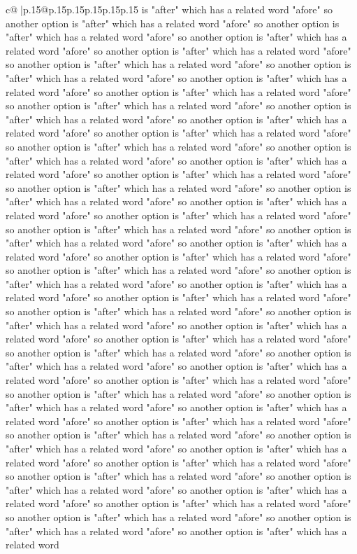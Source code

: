 \documentclass{article}
\begin{document}
{\begin{supertabular}{c@{$\;$}|p{.15\linewidth}@{}p{.15\linewidth}p{.15\linewidth}p{.15\linewidth}p{.15\linewidth}p{.15\linewidth}}
{{{is "after" which has a related word "afore" so another option is "after" which has a related word "afore" so another option is "after" which has a related word "afore" so another option is "after" which has a related word "afore" so another option is "after" which has a related word "afore" so another option is "after" which has a related word "afore" so another option is "after" which has a related word "afore" so another option is "after" which has a related word "afore" so another option is "after" which has a related word "afore" so another option is "after" which has a related word "afore" so another option is "after" which has a related word "afore" so another option is "after" which has a related word "afore" so another option is "after" which has a related word "afore" so another option is "after" which has a related word "afore" so another option is "after" which has a related word "afore" so another option is "after" which has a related word "afore" so another option is "after" which has a related word "afore" so another option is "after" which has a related word "afore" so another option is "after" which has a related word "afore" so another option is "after" which has a related word "afore" so another option is "after" which has a related word "afore" so another option is "after" which has a related word "afore" so another option is "after" which has a related word "afore" so another option is "after" which has a related word "afore" so another option is "after" which has a related word "afore" so another option is "after" which has a related word "afore" so another option is "after" which has a related word "afore" so another option is "after" which has a related word "afore" so another option is "after" which has a related word "afore" so another option is "after" which has a related word "afore" so another option is "after" which has a related word "afore" so another option is "after" which has a related word "afore" so another option is "after" which has a related word "afore" so another option is "after" which has a related word "afore" so another option is "after" which has a related word "afore" so another option is "after" which has a related word "afore" so another option is "after" which has a related word "afore" so another option is "after" which has a related word "afore" so another option is "after" which has a related word "afore" so another option is "after" which has a related word "afore" so another option is "after" which has a related word "afore" so another option is "after" which has a related word "afore" so another option is "after" which has a related word "afore" so another option is "after" which has a related word "afore" so another option is "after" which has a related word "afore" so another option is "after" which has a related word "afore" so another option is "after" which has a related word "afore" so another option is "after" which has a related word "afore" so another option is "after" which has a related word "afore" so another option is "after" which has a related word "afore" so another option is "after" which has a related word "afore" so another option is "after" which has a related word }}}
\end{supertabular}}
\end{document}
